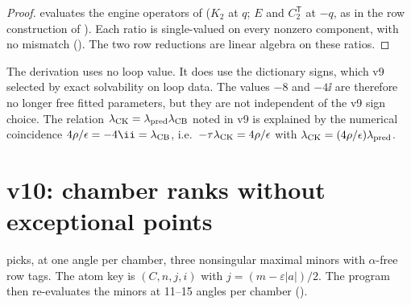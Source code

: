 \begin{proof}
 evaluates the engine operators of
 (\(K_2\) at \(q\); \(E\) and
\(C_2^{\mathsf T}\) at \(-q\), as in the row construction of
). Each ratio is single-valued on every
nonzero component, with no mismatch
(). The two row reductions are
linear algebra on these ratios.
\end{proof}

\begin{remark}
The derivation uses no loop value. It does use the dictionary
signs, which v9 selected by exact solvability on loop data. The
values \(-8\) and \(-4\ii\) are therefore no longer free fitted
parameters, but they are not independent of the v9 sign choice.
The relation \(\lambda_{\rm CK}=\lambda_{\rm pred}\lambda_{\rm CB}\)
noted in v9 is explained by the numerical coincidence
\(4\rho/\epsilon=-4\ii=\lambda_{\rm CB}\), i.e.\ \(-\tau\lambda_{\rm CK}=4\rho/\epsilon\) with
\(\lambda_{\rm CK}=(4\rho/\epsilon)\lambda_{\rm pred}\).
\end{remark}

\section{v10: chamber ranks without exceptional points}
\label{sec:v10chamber}

 picks, at one angle per chamber, three
nonsingular maximal minors with \(\alpha\)-free row tags. The atom
key is \((C,n,j,i)\) with \(j=(m-\varepsilon|a|)/2\). The program
then re-evaluates the minors at 11--15 angles per chamber
().

